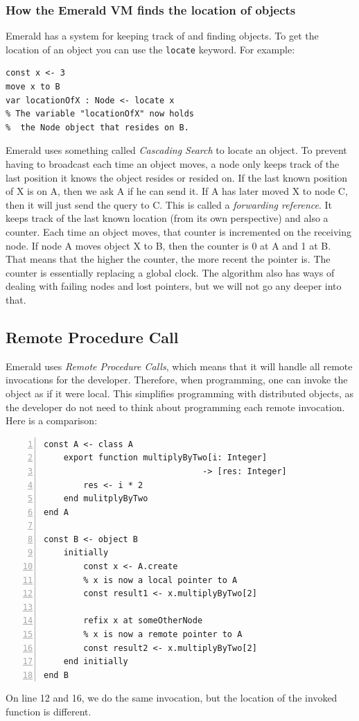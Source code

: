 \subsubsection{How the Emerald VM finds the location of objects}\label{cascading_search}
Emerald has a system for keeping track of and finding objects. To get the location of an object you can use the \verb|locate| keyword. For example:
\begin{lstlisting}[language=emerald]
const x <- 3
move x to B
var locationOfX : Node <- locate x
% The variable "locationOfX" now holds 
%  the Node object that resides on B.
\end{lstlisting}
Emerald uses something called \textit{Cascading Search} to locate an object. To prevent having to broadcast each time an object moves, a node only keeps track of the last position it knows the object resides or resided on. If the last known position of X is on A, then we ask A if he can send it. If A has later moved X to node C, then it will just send the query to C. This is called a \textit{forwarding reference}. It keeps track of the last known location (from its own perspective) and also a counter. Each time an object moves, that counter is incremented on the receiving node. If node A moves object X to B, then the counter is 0 at A and 1 at B. That means that the higher the counter, the more recent the pointer is. The counter is essentially replacing a global clock. The algorithm also has ways of dealing with failing nodes and lost pointers, but we will not go any deeper into that. 


\subsection{Remote Procedure Call}
Emerald uses \textit{Remote Procedure Calls}, which means that it will handle all remote invocations for the developer. Therefore, when programming, one can invoke the object as if it were local. This simplifies programming with distributed objects, as the developer do not need to think about programming each remote invocation. Here is a comparison:
\begin{lstlisting}[language=emerald, numbers=left]
const A <- class A
    export function multiplyByTwo[i: Integer] 
                                -> [res: Integer]
        res <- i * 2
    end mulitplyByTwo
end A

const B <- object B
    initially
        const x <- A.create
        % x is now a local pointer to A
        const result1 <- x.multiplyByTwo[2]
        
        refix x at someOtherNode
        % x is now a remote pointer to A
        const result2 <- x.multiplyByTwo[2] 
    end initially
end B
\end{lstlisting}
On line 12 and 16, we do the same invocation, but the location of the invoked function is different.

